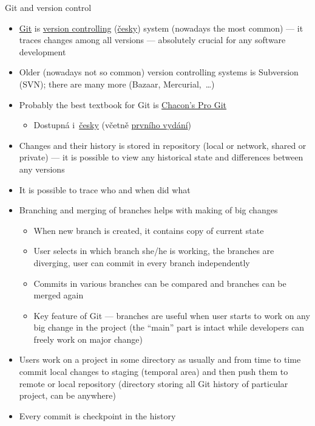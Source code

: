 \documentclass[compress, xelatex, 11pt, xcolor=svgnames, aspectratio=169, url={hyphens, lowtilde}]{beamer}
\begin{document}
\begin{frame}[allowframebreaks]{Git and version control}
	\begin{itemize}
		\item \href{https://git-scm.com/}{Git} is \href{https://en.wikipedia.org/wiki/Version_control}{version controlling} (\href{https://cs.wikipedia.org/wiki/Verzov\%C3\%A1n\%C3\%AD}{česky}) system (nowadays the most common) --- it traces changes among all versions --- absolutely crucial for any software development
		\item Older (nowadays not so common) version controlling systems is Subversion (SVN); there are many more (Bazaar, Mercurial,~\ldots)
		\item Probably the best textbook for Git is \href{https://git-scm.com/book/en/v2}{Chacon's Pro Git}
		\begin{itemize}
			\item Dostupná i~\href{https://git-scm.com/book/cs/v2}{česky} (včetně \href{https://knihy.nic.cz/cs/detail/2/}{prvního vydání})
		\end{itemize}
		\item Changes and their history is stored in repository (local or network, shared or private) --- it is possible to view any historical state and differences between any versions
		\item It is possible to trace who and when did what
		\item Branching and merging of branches helps with making of big changes
		\begin{itemize}
			\item When new branch is created, it contains copy of current state
			\item User selects in which branch she/he is working, the branches are diverging, user can commit in every branch independently
			\item Commits in various branches can be compared and branches can be merged again
			\item Key feature of Git --- branches are useful when user starts to work on any big change in the project (the \enquote{main} part is intact while developers can freely work on major change)
		\end{itemize}
		\item Users work on a project in some directory as usually and from time to time commit local changes to staging (temporal area) and then push them to remote or local repository (directory storing all Git history of particular project, can be anywhere)
		\item Every commit is checkpoint in the history

\end{itemize}
\end{frame}
\end{document}
